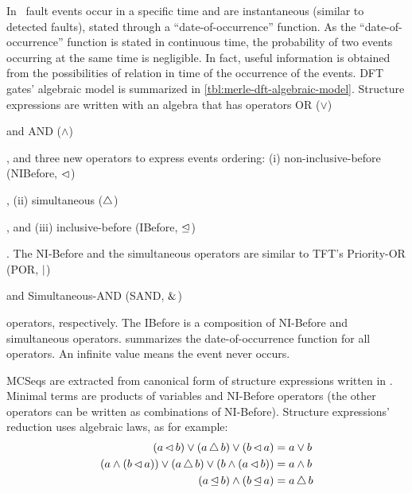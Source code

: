 \documentclass[en,twoside,onehalfspacing,phd]{risethesis}
\def\ortext{OR ($\lor$)%
  \gdef\ortext{OR\xspace}%
  \xspace
}
\def\andtext{AND ($\land$)%
  \gdef\andtext{AND\xspace}%
  \xspace
}
\def\portext{Priority-OR (POR, $\por$)%
  \gdef\portext{POR\xspace}%
  \xspace
}
\def\sandtext{Simultaneous-AND (SAND, $\sand$)%
  \gdef\sandtext{SAND\xspace}%
  \xspace
}
\def\nibeforetext{non-inclusive-before (NIBefore, $\nibefore$)%
  \gdef\nibeforetext{NI-Before\xspace}%
  \xspace
}
\def\ibeforetext{inclusive-before (IBefore, $\ibefore$)%
  \gdef\ibeforetext{IBefore\xspace}%
  \xspace
}
\def\simultaneoustext{simultaneous ($\simultaneous$)%
  \gdef\simultaneoustext{simultaneous\xspace}%
  \xspace
}
\newcommand{\parsin}[1]{\ensuremath\left( #1 \right)}
\def\por{\ensuremath\operatorname{|}}
\def\sand{\ensuremath\operatorname{\&}}
\def\nibefore{\ensuremath\operatorname{\lhd}}
\def\ibefore{\ensuremath\operatorname{\unlhd}}
\def\simultaneous{\ensuremath\operatorname{\bigtriangleup}}
\begin{document}
In~\cite{Merle2010,MRL+2010,MRL2011} fault events occur in a specific time and are instantaneous (similar to detected faults), stated through a ``date-of-occurrence'' function.
As the ``date-of-occurrence'' function is stated in continuous time, the probability of two events occurring at the same time is negligible.
In fact, useful information is obtained from the possibilities of relation in time of the occurrence of the events.
\Ac{DFT} gates' algebraic model is summarized in \cref{tbl:merle-dft-algebraic-model}.
Structure expressions are written with an algebra that has operators \ortext and \andtext, and three new operators to express events ordering: (i) \nibeforetext, (ii) \simultaneoustext, and (iii) \ibeforetext.
The \nibeforetext and the \simultaneoustext operators are similar to \ac{TFT}'s \portext and \sandtext operators, respectively.
The \ibeforetext is a composition of \nibeforetext and \simultaneoustext operators.
 summarizes the date-of-occurrence function for all operators.
An infinite value means the event never occurs.

\Acp{MCSeq} are extracted from canonical form of structure expressions written in .
Minimal terms are products of variables and \nibeforetext operators (the other operators can be written as combinations of \nibeforetext).
Structure expressions' reduction uses algebraic laws, as for example:
\begin{subequations}
\begin{align}
\parsin{a \nibefore b} \lor
  \parsin{a \simultaneous b} \lor
  \parsin{b \nibefore a} &= a \lor b\\
%
\parsin{a \land \parsin{b \nibefore a}} \lor
  \parsin{a \simultaneous b} \lor
  \parsin{b \land \parsin{a \nibefore b}} &= a \land b\\
%
\parsin{a \ibefore b} \land \parsin{b \ibefore a} &= a \simultaneous b
\end{align}
\end{subequations}
\end{document}
